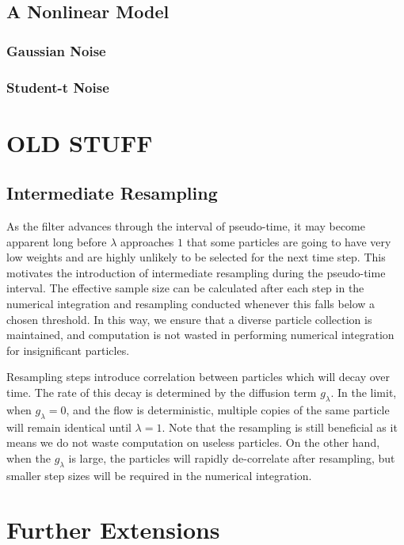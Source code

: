\documentclass[a4paper,10pt]{article}
\newcommand{\pt}{\lambda}                       %
\newcommand{\glam}{g_{\lambda}}
\begin{document}
\subsection{A Nonlinear Model}
\subsubsection{Gaussian Noise}
\subsubsection{Student-t Noise}





\section{OLD STUFF}


\subsection{Intermediate Resampling}

As the filter advances through the interval of pseudo-time, it may become apparent long before $\pt$ approaches $1$ that some particles are going to have very low weights and are highly unlikely to be selected for the next time step. This motivates the introduction of intermediate resampling during the pseudo-time interval. The effective sample size can be calculated after each step in the numerical integration and resampling conducted whenever this falls below a chosen threshold. In this way, we ensure that a diverse particle collection is maintained, and computation is not wasted in performing numerical integration for insignificant particles.

Resampling steps introduce correlation between particles which will decay over time. The rate of this decay is determined by the diffusion term $\glam$. In the limit, when $\glam=0$, and the flow is deterministic, multiple copies of the same particle will remain identical until $\pt=1$. Note that the resampling is still beneficial as it means we do not waste computation on useless particles. On the other hand, when the $\glam$ is large, the particles will rapidly de-correlate after resampling, but smaller step sizes will be required in the numerical integration.



\section{Further Extensions}
\end{document}
